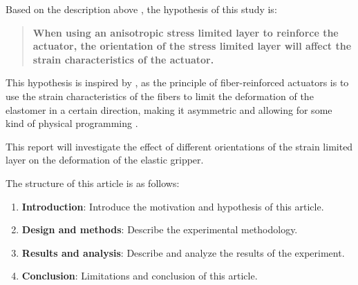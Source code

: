 \documentclass[conference]{IEEEtran}
\begin{document}
Based on the description above , the hypothesis of this study is:
\begin{quote}
\textbf{When using an anisotropic stress limited layer to reinforce the actuator, the orientation of the stress limited layer will affect the strain characteristics of the actuator.}
\end{quote}


This hypothesis is inspired by \cite{mechanical_programing}, as the principle of fiber-reinforced actuators is to use the strain characteristics of the fibers to limit the deformation of the elastomer in a certain direction, making it asymmetric and allowing for some kind of physical programming \cite{fingerlike}. 



This report will investigate the effect of different orientations of the strain limited layer on the deformation of the elastic gripper.


The structure of this article is as follows:
\begin{enumerate}
    \item \textbf{Introduction}: Introduce the motivation and hypothesis of this article.
    \item \textbf{Design and methods}: Describe the experimental methodology.
    \item \textbf{Results and analysis}: Describe and analyze the results of the experiment.
    \item \textbf{Conclusion}: Limitations and conclusion of this article.
\end{enumerate}
\end{document}
